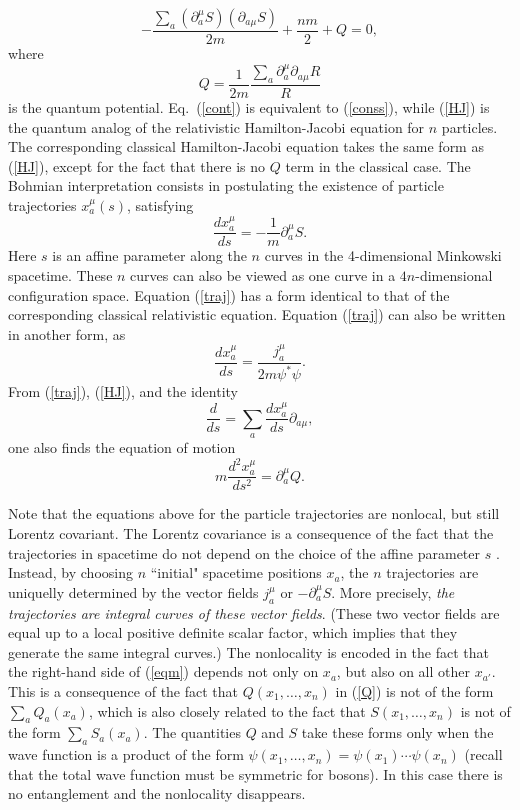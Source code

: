 \documentclass[11pt]{article}
\begin{document}
\begin{equation}\label{HJ}
-\frac{\sum_a(\partial_a^{\mu}S)(\partial_{a\mu}S)}{2m} +\frac{nm}{2} +Q=0,
\end{equation}
where
\begin{equation}\label{Q}
Q=\frac{1}{2m}\frac{\sum_a\partial_a^{\mu}\partial_{a\mu}R}{R}
\end{equation}
is the quantum potential. Eq.~(\ref{cont}) is equivalent to 
(\ref{conss}), while (\ref{HJ}) is the quantum analog of the 
relativistic Hamilton-Jacobi equation for $n$ particles. 
The corresponding classical Hamilton-Jacobi equation takes the same
form as (\ref{HJ}), except for the fact that there is no $Q$ term
in the classical case.  
The Bohmian interpretation consists in postulating the existence 
of particle trajectories $x_a^{\mu}(s)$, satisfying
\begin{equation}\label{traj}
\frac{dx_a^{\mu}}{ds} = -\frac{1}{m}\partial_a^{\mu}S .
\end{equation} 
Here $s$ is an affine parameter along the $n$ curves
in the 4-dimensional Minkowski spacetime. These $n$ curves can also 
be viewed as one curve in a $4n$-dimensional configuration 
space. Equation (\ref{traj}) has a form identical 
to that of the corresponding
classical relativistic equation. Equation (\ref{traj}) 
can also be written in another form, as
\begin{equation}\label{traj2}
\frac{dx_a^{\mu}}{ds} = \frac{j_a^{\mu}}{2m\psi^*\psi} .
\end{equation}
From (\ref{traj}), (\ref{HJ}), and the identity 
\begin{equation}
\frac{d}{ds}=\sum_a\frac{dx_a^{\mu}}{ds}\partial_{a\mu},
\end{equation}
one also finds the equation of motion
\begin{equation}\label{eqm}
m\frac{d^2x_a^{\mu}}{ds^2}=\partial_a^{\mu}Q.
\end{equation}

Note that the equations above for the particle trajectories are nonlocal, 
but still Lorentz covariant.
The Lorentz covariance is a consequence of the fact that the trajectories 
in spacetime do not depend on the choice of the affine parameter 
$s$ \cite{bern}. Instead, by choosing $n$ ``initial" spacetime positions
$x_a$, the $n$ trajectories are uniquelly determined by the vector fields 
$j_a^{\mu}$ or $-\partial_a^{\mu}S$. More precisely, 
{\em the trajectories are integral curves of these vector fields}. 
(These two vector fields are equal up to a local positive definite scalar
factor, which implies that they generate the same integral curves.)  
The nonlocality is encoded in the fact that the right-hand 
side of (\ref{eqm}) depends not only on $x_a$, but also 
on all other $x_{a'}$. This is a consequence of the fact that 
$Q(x_1,\ldots ,x_n)$ in (\ref{Q}) is not of the form 
$\sum_a Q_a(x_a)$, which is also closely related to the fact that
$S(x_1,\ldots ,x_n)$ is not of the form 
$\sum_a S_a(x_a)$. The quantities $Q$ and $S$ take these forms 
only when the wave function is a product of the form
$\psi(x_1,\ldots ,x_n)=\psi(x_1)\cdots\psi(x_n)$ (recall that the 
total wave function must be symmetric for bosons). In this case 
there is no entanglement and the nonlocality disappears. 
\end{document}
